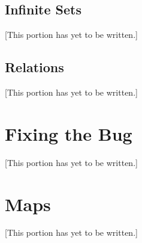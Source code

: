 \documentclass[12pt]{article}
\newcommand{\note}[1]{[This portion has yet to be written.]}
\def\Z{\mathbb{Z}}
\newcounter{theorem}
\begin{document}
\subsection{Infinite Sets}

\note{to be written}


\subsection{Relations}

\note{Equivlance relations and partitions.
Consider defining $\Z$ using equivalence relations.
Consider talking about partial orders, and other sorts of relations.
Consider introducing ideas of $\sup$ and $\inf$.}


\appendix

\section{Fixing the Bug}

\note{Explain what is broken about the membership axiom. Outline some of the changes that need to be made to align the development here to proper NBG set theory,
going through how the membership axiom can be repaired, and what new axioms need to be introduced to let pretty much the same machinery run.
}

\section{Maps}

\note{Describe the category of sets and the theorems from the functions chapter that can be re-construed as properties of the category of sets.
Emphasize the importance of ``fixing the bug'' for the purpose of doing category theory.
Mention that there are many categories.}






\end{document}
